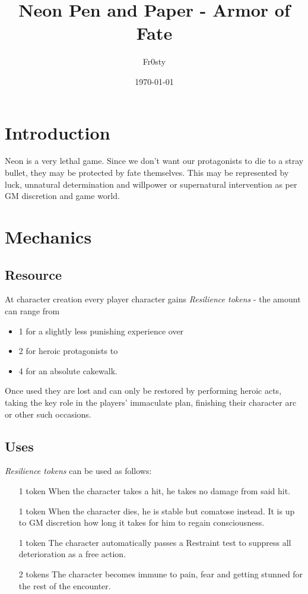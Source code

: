 \documentclass[12pt,a4paper,openany]{book}
\title{Neon Pen and Paper - Armor of Fate}
\author{Fr0sty}
\date{\today}
\begin{document}
	\chapter{Introduction}
	Neon is a very lethal game. Since we don't want our protagonists to die to a stray bullet, they may be protected by fate themselves. This may be represented by luck, unnatural determination and willpower or supernatural intervention as per GM discretion and game world.
	
	\chapter{Mechanics}
	\section{Resource}
	At character creation every player character gains \emph{Resilience tokens} - the amount can range from
	\begin{itemize}
		\item 1 for a slightly less punishing experience over
		\item 2 for heroic protagonists to
		\item 4 for an absolute cakewalk.
	\end{itemize}
	Once used they are lost and can only be restored by performing heroic acts, taking the key role in the players' immaculate plan, finishing their character arc or other such occasions.
	
	\section{Uses}
	\emph{Resilience tokens} can be used as follows:
	\begin{itemize}
		\item[1 token] When the character takes a hit, he takes no damage from said hit.
		\item[1 token] When the character dies, he is stable but comatose instead. It is up to GM discretion how long it takes for him to regain consciousness.
		\item[1 token] The character automatically passes a Restraint test to suppress all deterioration as a free action.
		\item[2 tokens] The character becomes immune to pain, fear and getting stunned for the rest of the encounter.
	\end{itemize}
\end{document}
